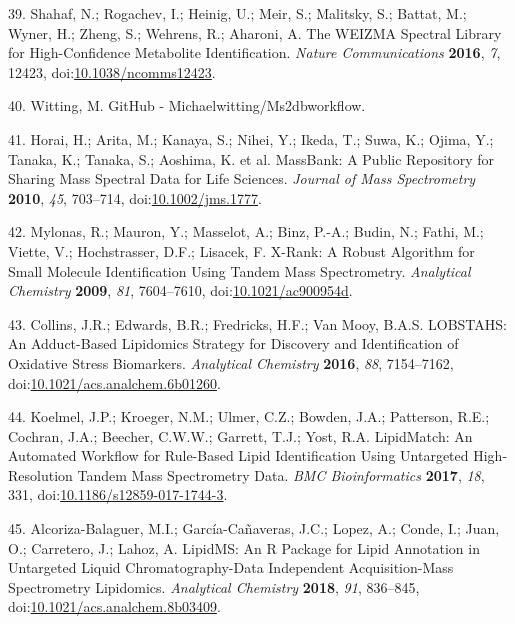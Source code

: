 \documentclass[]{article}
\begin{document}
\leavevmode\hypertarget{ref-shahaf_2016}{}%
39. Shahaf, N.; Rogachev, I.; Heinig, U.; Meir, S.; Malitsky, S.; Battat, M.; Wyner, H.; Zheng, S.; Wehrens, R.; Aharoni, A. The WEIZMA Spectral Library for High-Confidence Metabolite Identification. \emph{Nature Communications} \textbf{2016}, \emph{7}, 12423, doi:\href{https://doi.org/10.1038/ncomms12423}{10.1038/ncomms12423}.

\leavevmode\hypertarget{ref-witting_website_nd}{}%
40. Witting, M. GitHub - Michaelwitting/Ms2dbworkflow.

\leavevmode\hypertarget{ref-horai_2010}{}%
41. Horai, H.; Arita, M.; Kanaya, S.; Nihei, Y.; Ikeda, T.; Suwa, K.; Ojima, Y.; Tanaka, K.; Tanaka, S.; Aoshima, K. et al. MassBank: A Public Repository for Sharing Mass Spectral Data for Life Sciences. \emph{Journal of Mass Spectrometry} \textbf{2010}, \emph{45}, 703--714, doi:\href{https://doi.org/10.1002/jms.1777}{10.1002/jms.1777}.

\leavevmode\hypertarget{ref-mylonas_2009}{}%
42. Mylonas, R.; Mauron, Y.; Masselot, A.; Binz, P.-A.; Budin, N.; Fathi, M.; Viette, V.; Hochstrasser, D.F.; Lisacek, F. X-Rank: A Robust Algorithm for Small Molecule Identification Using Tandem Mass Spectrometry. \emph{Analytical Chemistry} \textbf{2009}, \emph{81}, 7604--7610, doi:\href{https://doi.org/10.1021/ac900954d}{10.1021/ac900954d}.

\leavevmode\hypertarget{ref-collins_2016}{}%
43. Collins, J.R.; Edwards, B.R.; Fredricks, H.F.; Van Mooy, B.A.S. LOBSTAHS: An Adduct-Based Lipidomics Strategy for Discovery and Identification of Oxidative Stress Biomarkers. \emph{Analytical Chemistry} \textbf{2016}, \emph{88}, 7154--7162, doi:\href{https://doi.org/10.1021/acs.analchem.6b01260}{10.1021/acs.analchem.6b01260}.

\leavevmode\hypertarget{ref-koelmel_2017}{}%
44. Koelmel, J.P.; Kroeger, N.M.; Ulmer, C.Z.; Bowden, J.A.; Patterson, R.E.; Cochran, J.A.; Beecher, C.W.W.; Garrett, T.J.; Yost, R.A. LipidMatch: An Automated Workflow for Rule-Based Lipid Identification Using Untargeted High-Resolution Tandem Mass Spectrometry Data. \emph{BMC Bioinformatics} \textbf{2017}, \emph{18}, 331, doi:\href{https://doi.org/10.1186/s12859-017-1744-3}{10.1186/s12859-017-1744-3}.

\leavevmode\hypertarget{ref-alcorizabalaguer_2018}{}%
45. Alcoriza-Balaguer, M.I.; García-Cañaveras, J.C.; Lopez, A.; Conde, I.; Juan, O.; Carretero, J.; Lahoz, A. LipidMS: An R Package for Lipid Annotation in Untargeted Liquid Chromatography-Data Independent Acquisition-Mass Spectrometry Lipidomics. \emph{Analytical Chemistry} \textbf{2018}, \emph{91}, 836--845, doi:\href{https://doi.org/10.1021/acs.analchem.8b03409}{10.1021/acs.analchem.8b03409}.
\end{document}
